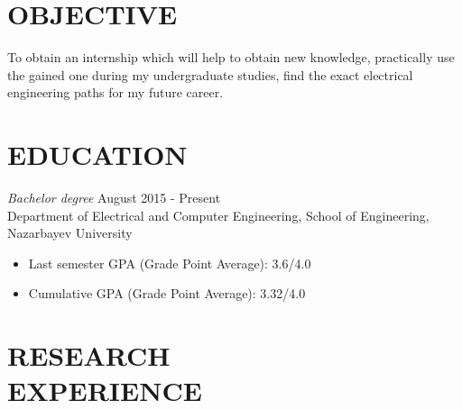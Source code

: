 \documentclass[margin, 10pt]{res} %
\begin{document}
\begin{resume}

 
\section{OBJECTIVE}  

To obtain an internship which will help to obtain new knowledge, practically use the gained one during my undergraduate studies, find the exact electrical engineering paths for my future career.


\section{EDUCATION}

{\sl Bachelor degree} \hfill August 2015 - Present \\
Department of Electrical and Computer Engineering, School of Engineering, Nazarbayev University
\begin{itemize}
\item Last semester GPA (Grade Point Average): 3.6/4.0
\item Cumulative GPA (Grade Point Average): 3.32/4.0
\end{itemize} 


 
\section{RESEARCH \\ EXPERIENCE}



\end{resume}
\end{document}
